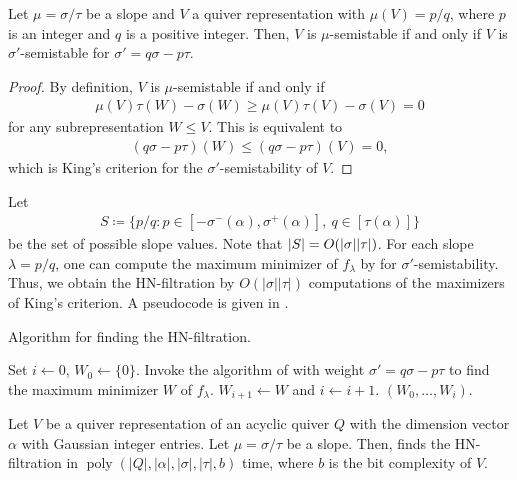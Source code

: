 \documentclass[a4paper,11pt]{article}
\numberwithin{equation}{section}
\DeclareMathOperator{\poly}{poly}
\DeclarePairedDelimiter{\abs}{\lvert}{\rvert}
\begin{document}
\begin{lemma}\label{lem:slope-to-weight}
    Let $\mu = \sigma/\tau$ be a slope and $V$ a quiver representation with $\mu(V) = p/q$, where $p$ is an integer and $q$ is a positive integer.
    Then, $V$ is $\mu$-semistable if and only if $V$ is $\sigma'$-semistable for $\sigma' = q\sigma - p \tau$.
\end{lemma}
\begin{proof}
    By definition, $V$ is $\mu$-semistable if and only if
    \begin{align}
        \mu(V)\tau(W) - \sigma(W) \geq \mu(V)\tau(V) - \sigma(V) = 0
    \end{align}
    for any subrepresentation $W \leq V$.
    This is equivalent to 
    \begin{align}
        (q\sigma - p\tau)(W)  \leq (q\sigma - p\tau)(V) = 0,
    \end{align}
    which is King's criterion for the $\sigma'$-semistability of $V$.
\end{proof}

Let 
\begin{align}
    S \coloneqq \{ p / q : p \in [-\sigma^-(\alpha), \sigma^+(\alpha)],\ q \in [\tau(\alpha)] \}
\end{align}
be the set of possible slope values.
Note that $\abs{S} = O(|\sigma||\tau|)$.
For each slope $\lambda = p/q$, one can compute the maximum minimizer of $f_\lambda$ by  for $\sigma'$-semistability.
Thus, we obtain the HN-filtration by $O(|\sigma||\tau|)$ computations of the maximizers of King's criterion.
A pseudocode is given in .

\begin{algorithm}
    \caption{Algorithm for finding the HN-filtration.\label{alg:HN}}
\begin{algorithmic}[1]
    \State Set $i \gets 0$, $W_0 \gets \{0\}$.
    \State Invoke the algorithm of  with weight $\sigma' = q\sigma - p \tau$ to find the maximum minimizer $W$ of $f_\lambda$.
    \State $W_{i+1} \gets W$ and $i \gets i + 1$.
    \EndIf
    \EndFor
    \State \Return $(W_0, \dots, W_i)$.
\end{algorithmic}
\end{algorithm}

\begin{theorem}\label{thm:HN}
    Let $V$ be a quiver representation of an acyclic quiver $Q$ with the dimension vector $\alpha$ with Gaussian integer entries.
    Let $\mu = \sigma/\tau$ be a slope.
    Then,  finds the HN-filtration in $\poly(|Q|, |\alpha|, |\sigma|, |\tau|, b)$ time, where $b$ is the bit complexity of $V$.
\end{theorem}
\end{document}
